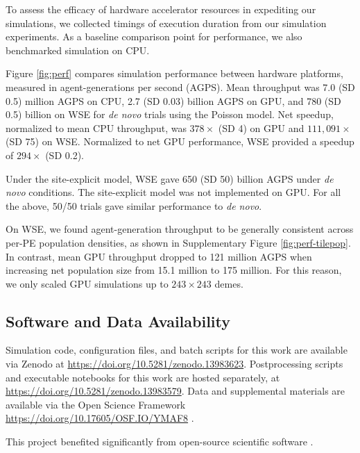

To assess the efficacy of hardware accelerator resources in expediting our simulations, we collected timings of execution duration from our simulation experiments.
As a baseline comparison point for performance, we also benchmarked simulation on CPU.

Figure \ref{fig:perf} compares simulation performance between hardware platforms, measured in agent-generations per second (AGPS).
Mean throughput was 7.0 (SD 0.5) million AGPS on CPU, 2.7 (SD 0.03) billion AGPS on GPU, and 780 (SD 0.5) billion on WSE for \textit{de novo} trials using the Poisson model.
Net speedup, normalized to mean CPU throughput, was $378\times$ (SD 4) on GPU and $111,091\times$ (SD 75) on WSE.
Normalized to net GPU performance, WSE provided a speedup of $294\times$ (SD 0.2).

Under the site-explicit model, WSE gave 650 (SD 50) billion AGPS under \textit{de novo} conditions.
The site-explicit model was not implemented on GPU.
For all the above, 50/50 trials gave similar performance to \textit{de novo}.

On WSE, we found agent-generation throughput to be generally consistent across per-PE population densities, as shown in Supplementary Figure \ref{fig:perf-tilepop}.
In contrast, mean GPU throughput dropped to 121 million AGPS when increasing net population size from 15.1 million to 175 million.
For this reason, we only scaled GPU simulations up to $243 \times 243$ demes.

\subsection{Software and Data Availability} \label{sec:materials}

Simulation code, configuration files, and batch scripts for this work are available via Zenodo at \url{https://doi.org/10.5281/zenodo.13983623}.
Postprocessing scripts and executable notebooks for this work are hosted separately, at \url{https://doi.org/10.5281/zenodo.13983579}.
Data and supplemental materials are available via the Open Science Framework \url{https://doi.org/10.17605/OSF.IO/YMAF8} \citep{foster2017open}.

This project benefited significantly from open-source scientific software \citep{2020SciPy-NMeth,harris2020array,reback2020pandas,mckinney-proc-scipy-2010,waskom2021seaborn,hunter2007matplotlib,moreno2023teeplot}.
